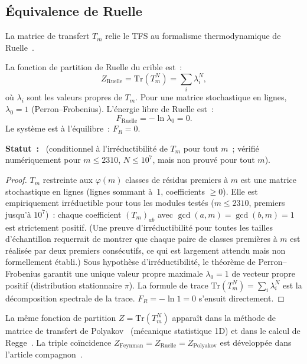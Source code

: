 \documentclass[12pt,a4paper]{article}
\begin{document}
\subsection{Équivalence de Ruelle}
\label{sec:ruelle}

La matrice de transfert $T_m$ relie le TFS au formalisme
thermodynamique de Ruelle~\cite{Ruelle1978}.

\mID
\begin{idbox}
\label{id:ruelle}
La fonction de partition de Ruelle du crible est~:
\begin{equation}
  Z_{\mathrm{Ruelle}} = \mathrm{Tr}(T_m^N) = \sum_i \lambda_i^N,
  \label{eq:ruelle}
\end{equation}
où $\lambda_i$ sont les valeurs propres de $T_m$. Pour une matrice
stochastique en lignes, $\lambda_0 = 1$ (Perron--Frobenius).
L'énergie libre de Ruelle est~:
\begin{equation}
  F_{\mathrm{Ruelle}} = -\ln \lambda_0 = 0.
  \label{eq:ruelle_free}
\end{equation}
Le système est à l'équilibre~: $F_R = 0$.

\medskip\noindent\textbf{Statut~:} \CONDTAG\ (conditionnel à
l'irréductibilité de $T_m$ pour tout $m$~; vérifié numériquement pour
$m \leq 2310$, $N \leq 10^7$, mais non prouvé pour tout $m$).

\begin{proof}
$T_m$ restreinte aux $\varphi(m)$ classes de résidus premiers à $m$
est une matrice stochastique en lignes (lignes sommant à~1,
coefficients $\geq 0$). Elle est empiriquement irréductible pour tous
les modules testés ($m \leq 2310$, premiers jusqu'à $10^7$)~: chaque
coefficient $(T_m)_{ab}$ avec $\gcd(a,m) = \gcd(b,m) = 1$ est
strictement positif. (Une preuve d'irréductibilité pour toutes les
tailles d'échantillon requerrait de montrer que chaque paire de
classes premières à $m$ est réalisée par deux premiers consécutifs,
ce qui est largement attendu mais non formellement établi.)
Sous hypothèse d'irréductibilité, le théorème de Perron--Frobenius
garantit une unique valeur propre maximale $\lambda_0 = 1$ de vecteur
propre positif (distribution stationnaire $\pi$).
La formule de trace $\mathrm{Tr}(T_m^N) = \sum_i \lambda_i^N$ est la
décomposition spectrale de la trace.
$F_R = -\ln 1 = 0$ s'ensuit directement.
\end{proof}
\end{idbox}

\begin{remarque}
La même fonction de partition $Z = \mathrm{Tr}(T_m^N)$ apparaît dans
la méthode de matrice de transfert de
Polyakov~\cite{Polyakov1981} (mécanique statistique 1D) et dans le
calcul de Regge~\cite{Regge1959}. La triple coïncidence
$Z_{\mathrm{Feynman}} = Z_{\mathrm{Ruelle}} = Z_{\mathrm{Polyakov}}$
est développée dans l'article compagnon~\cite{companion_M5}.
\end{remarque}
\end{document}
